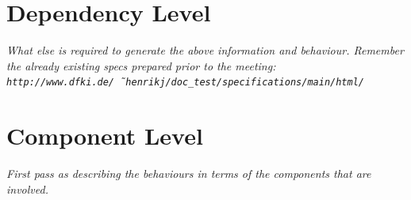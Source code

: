 \documentclass{article}
\begin{document}
\section{Dependency Level}

\textit{
  What else is required to generate the above information and
  behaviour. Remember the already existing specs prepared prior to the
  meeting: \texttt{http://www.dfki.de/\~\ henrikj/doc\_test/specifications/main/html/}}


\section{Component Level}

\textit{
  First pass as describing the behaviours in terms of the components
  that are involved.}
\end{document}
